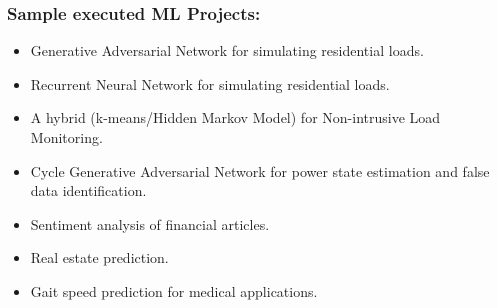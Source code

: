 \documentclass[11pt]{report}
\begin{document}
\subsubsection*{Sample executed ML Projects:}
\begin{itemize}[label={--}]
	
\item Generative Adversarial Network for simulating residential loads. 
\item Recurrent Neural Network for simulating residential loads.
\item A hybrid (k-means/Hidden Markov Model) for Non-intrusive Load Monitoring.
\item Cycle Generative Adversarial Network for power state estimation and false data identification.  
\item Sentiment analysis of financial articles. 
\item Real estate prediction.
\item Gait speed prediction for medical applications.
	
\end{itemize}





%
%
%
%
%
%
%
%
%
%
%
\end{document}
